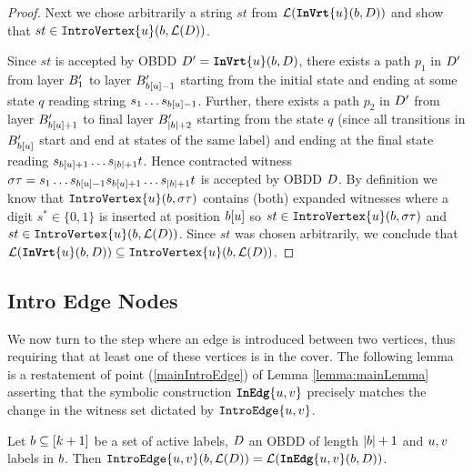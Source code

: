 \begin{proof}
Next we chose arbitrarily a string $st$ from $\mathcal{L}(\texttt{\textbf{InVrt}}\{u\}(b,D))$ and show that $st \in \texttt{IntroVertex}\{u\}(b,\mathcal{L}(D))$.

Since $st$ is accepted by OBDD $D' = \texttt{\textbf{InVrt}}\{u\}(b,D)$, there exists a path $p_1$ in $D'$ from layer $B'_1$ to layer $B'_{b[u]-1}$ starting from the initial state and ending at some state $q$ reading string $s_1\dots s_{b[u]-1}$. Further, there exists a path $p_2$ in $D'$ from layer $B'_{b[u]+1}$ to final layer $B'_{|b| + 2}$ starting from the state $q$ (since all transitions in $B'_{b[u]}$ start and end at states of the same label) and ending at the final state reading $s_{b[u] + 1} \dots s_{|b|+1}t$.
Hence contracted witness $\sigma\tau= s_1 \dots s_{b[u] - 1}s_{b[u] + 1} \dots s_{|b|+1}t$ is accepted by OBDD $D$. By definition we know that $\texttt{IntroVertex}\{u\}(b, \sigma\tau)$ contains (both) expanded witnesses where a digit $s^* \in \{0,1\}$ is inserted at position $b[u]$ so $st \in \texttt{IntroVertex}\{u\}(b, \sigma\tau)$ and $st \in \texttt{IntroVertex}\{u\}(b,\mathcal{L}(D))$. Since $st$ was chosen arbitrarily, we conclude that $\mathcal{L}(\texttt{\textbf{InVrt}}\{u\}(b,D)) \subseteq \texttt{IntroVertex}\{u\}(b,\mathcal{L}(D))$.
 

\end{proof}


\subsection{Intro Edge Nodes}

We now turn to the step where an edge is introduced between two vertices, thus requiring that at least one of these vertices is in the cover. The following lemma is a restatement of point (\ref{mainIntroEdge}) of Lemma \ref{lemma:mainLemma} asserting that the symbolic construction $\texttt{\textbf{InEdg}}\{u,v\}$ precisely matches the change in the witness set dictated by $\texttt{IntroEdge}\{u,v\}$.

\begin{lemma}
\label{lemma:SymbolicEdgeAppendix}
Let $b \subseteq [k+1]$ be a set of active labels, $D$ an OBDD of length $|b|+1$ and $u, v$ labels in $b$. Then  $\texttt{IntroEdge}\{u,v\}(b, \mathcal{L}(D))  = \mathcal{L}(\texttt{\textbf{InEdg}}\{u,v\}(b, D))$.
\end{lemma}


